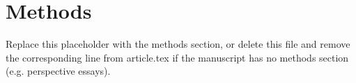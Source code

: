 \section{Methods}
\label{sec:methods}




Replace this placeholder with the methods section, or delete this file
and remove the corresponding \verb|| line from article.tex if the
manuscript has no methods section (e.g. perspective essays).
